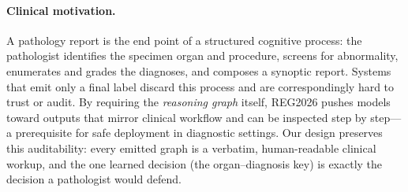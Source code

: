 \documentclass[11pt,a4paper]{article}
\begin{document}
\paragraph{Clinical motivation.}
A pathology report is the end point of a structured cognitive process: the pathologist
identifies the specimen organ and procedure, screens for abnormality, enumerates and grades the
diagnoses, and composes a synoptic report. Systems that emit only a final label discard this
process and are correspondingly hard to trust or audit. By requiring the \emph{reasoning graph}
itself, REG2026 pushes models toward outputs that mirror clinical workflow and can be inspected
step by step---a prerequisite for safe deployment in diagnostic settings. Our design preserves
this auditability: every emitted graph is a verbatim, human-readable clinical workup, and the one
learned decision (the organ--diagnosis key) is exactly the decision a pathologist would defend.
\end{document}
